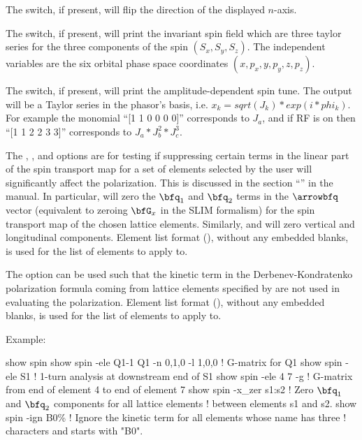 {{{{{{{{{The  switch, if present, will flip the direction of the displayed $n$-axis. 

The  switch, if present, will print the invariant spin field which are three taylor series
for the three components of the spin $(S_x, S_y, S_z)$. The independent variables are the six orbital
phase space coordinates $(x, p_x, y, p_y, z, p_z)$.

The  switch, if present, will print the amplitude-dependent spin tune. The output will 
be a Taylor series in the phasor's basis, i.e. $x_k = sqrt(J_k)*exp(i*phi_k)$. For example the 
monomial ``[1 1 0 0 0 0]'' corresponds to $J_a$, and if RF is on then ``[1 1 2 2 3 3]'' corresponds 
to $J_a*J_b^2*J_c^3$.

The , , and  options are for testing if suppressing certain terms
in the linear part of the spin transport map for a set of elements selected by the user will
significantly affect the polarization. This is discussed in the section ``'' in the \bmad manual. In particular,  will zero the $\bfq_1$ and $\bfq_2$
terms in the $\arrowbfq$ vector (equivalent to zeroing $\bfG_x$ in the SLIM formalism) for the spin
transport map of the chosen lattice elements. Similarly,  and  will zero
vertical and longitudinal components. Element list format (), without any
embedded blanks, is used for the  list of elements to apply to.

The  option can be used such that the kinetic term in the Derbenev-Kondratenko
polarization formula coming from lattice elements specified by  are not used in
evaluating the polarization. Element list format (), without any embedded
blanks, is used for the  list of elements to apply to.


Example:
\begin{example}
  show spin
  show spin -ele Q1-1 Q1 -n 0,1,0 -l 1,0,0  ! G-matrix for Q1
  show spin -ele S1      ! 1-turn analysis at downstream end of S1 
  show spin -ele 4 7 -g  ! G-matrix from end of element 4 to end of element 7
  show spin -x_zer s1:s2 ! Zero \(\bfq_1\) and \(\bfq_2\) components for all lattice elements
                         ! between elements s1 and s2.
  show spin -ign B0\%    ! Ignore the kinetic term for all elements whose name has three 
                         !   characters and starts with "B0".
\end{example}

}}}}}}}}}
